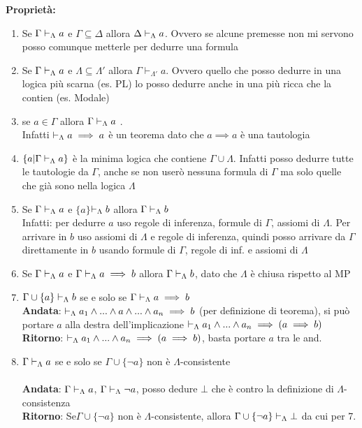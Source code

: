 \textbf{Proprietà:} $ $ 
\begin{enumerate}
\item Se $\Gamma\vdash_{\Lambda}a$ e $\Gamma\subseteq\Delta$ allora $\Delta\vdash_{\Lambda}a$.
Ovvero se alcune premesse non mi servono posso comunque metterle per
dedurre una formula 
\item Se $\Gamma\vdash_{\Lambda}a$ e $\Lambda\subseteq\Lambda'$ allora $\Gamma\vdash_{\Lambda'}a$.
Ovvero quello che posso dedurre in una logica più scarna (es. PL)
lo posso dedurre anche in una più ricca che la contien (es. Modale) 
\item se $a\in\Gamma$ allora $\Gamma\vdash_{\Lambda}a$ . \\
 Infatti $\vdash_{\Lambda}a\implies a$ è un teorema dato che $a\implies a$
è una tautologia 
\item $\{a|\Gamma\vdash_{\Lambda}a\}$ è la minima logica che contiene $\Gamma\cup\Lambda$.
Infatti posso dedurre tutte le tautologie da $\Gamma$, anche se non
userò nessuna formula di $\Gamma$ ma solo quelle che già sono nella
logica $\Lambda$ $ $ 
\item Se $\Gamma\vdash_{\Lambda}a$ e $\{a\}$$\vdash_{\Lambda}b$ allora $\Gamma\vdash_{\Lambda}b$ \\
 Infatti: per dedurre $a$ uso regole di inferenza, formule di $\Gamma$,
assiomi di $\Lambda$. Per arrivare in $b$ uso assiomi di $\Lambda$
e regole di inferenza, quindi posso arrivare da $\Gamma$ direttamente
in $b$ usando formule di $\Gamma$, regole di inf. e assiomi di $\Lambda$ 
\item Se $\Gamma\vdash_{\Lambda}a$ e $\Gamma\vdash_{\Lambda}a\implies b$ allora $\Gamma\vdash_{\Lambda}b$, dato
che $\Lambda$ è chiusa rispetto al MP 
\item $\Gamma\cup\{a\}\vdash_{\Lambda}b$ se e solo se $\Gamma\vdash_{\Lambda}a\implies b$
\\
 \textbf{Andata}: $\vdash_{\Lambda}a_{1}\wedge...\wedge a\wedge...\wedge a_{n}\implies b$
(per definizione di teorema), si può portare $a$ alla destra dell'implicazione
$\vdash_{\Lambda}a_{1}\wedge...\wedge a_{n}\implies(a\implies b)$ \\
 \textbf{Ritorno}: $\vdash_{\Lambda}a_{1}\wedge...\wedge a_{n}\implies(a\implies b)$,
basta portare $a$ tra le $ $and. 
\item $\Gamma\vdash_{\Lambda}a$ se e solo se $\Gamma\cup\{\neg a\}$ non è $\Lambda$-consistente
\\
 \\
 \textbf{Andata}: $\Gamma\vdash_{\Lambda}a$, $\Gamma\vdash_{\Lambda}\neg a$, posso dedure
$\bot$ che è contro la definizione di $\Lambda$-consistenza\\
 \textbf{Ritorno}: Se$ $$\Gamma\cup\{\neg a\}$ non è $\Lambda$-consistente,
allora $\Gamma\cup\{\neg a\}\vdash_{\Lambda}\bot$ da cui per 7. \\

\end{enumerate}
